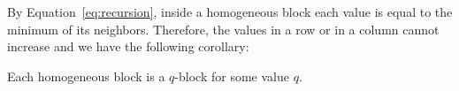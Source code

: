 By Equation~\ref{eq:recursion}, inside a homogeneous block each value is equal to the minimum of its neighbors. Therefore, the values in a row or in a column cannot increase and we have the following corollary:
\begin{corollary}\label{cor:homogeneous}
Each homogeneous block is a $q$-block for some value $q$.
\end{corollary}







